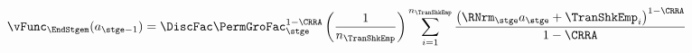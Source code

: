   \begin{equation}\begin{gathered}\begin{aligned}
        \vFunc_{\EndStgem}({a}_{\stge-1})  & =   \DiscFac \PermGroFac_{\stge}^{1-\CRRA}\left(\frac{1}{n_{\TranShkEmp}}\right)\sum_{i=1}^{n_{\TranShkEmp}}   \frac{\left(\RNrm_{\stge} {a}_{\stge} + \TranShkEmp_{i}\right)^{1-\CRRA}}{1-\CRRA} \label{eq:vDiscrete}
      \end{aligned}\end{gathered}\end{equation}
